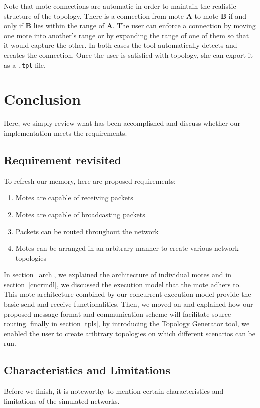 \documentclass[11pt, titlepage, oneside]{article}
\begin{document}
Note that mote connections are automatic in order to maintain the realistic structure of the topology. There is a connection from mote {\bf A} to mote {\bf B} if and only if {\bf B} lies within the range of {\bf A}. The user can enforce a connection by moving one mote into another's range or by expanding the range of one of them so that it would capture the other. In both cases the tool automatically detects and creates the connection. Once the user is satisfied with topology, she can export it as a {\tt *.tpl} file.

\section{Conclusion} 
Here, we simply review what has been accomplished and discuss whether our implementation meets the requirements.
\subsection{Requirement revisited} 
 To refresh our memory, here are proposed requirements:

\begin{enumerate} 
\item Motes are capable of receiving packets 
\item Motes are capable of broadcasting packets 
\item Packets can be routed throughout the network 
\item Motes can be arranged in an arbitrary manner to create various network topologies
\end{enumerate}

In section~\ref{arch}, we explained the architecture of individual motes and in section~\ref{cncrmdl}, we discussed the execution model that the mote adhers to. This mote architecture combined by our concurrent execution model provide the basic send and receive functionalities. Then, we moved on and explained how our proposed message format and communication scheme will facilitate source routing. finally in section \ref{tpls}, by introducing the Topology Generator tool, we enabled the user to create aribtrary topologies on which different scenarios can be run.
 
\subsection{Characteristics and Limitations}  

Before we finish, it is noteworthy to mention certain characteristics and limitations of the simulated networks.
\end{document}
